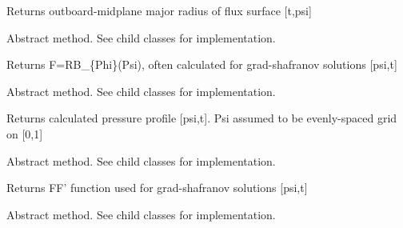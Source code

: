\documentclass[letterpaper,10pt,english]{sphinxmanual}
\begin{document}
\begin{fulllineitems}
\begin{fulllineitems}
Returns outboard-midplane major radius of flux surface {[}t,psi{]}

\end{fulllineitems}


\begin{fulllineitems}
\label{\detokenize{eqtools:eqtools.core.Equilibrium.getF}}
Abstract method.  See child classes for implementation.

Returns F=RB\_\{Phi\}(Psi), often calculated for grad-shafranov solutions  {[}psi,t{]}

\end{fulllineitems}


\begin{fulllineitems}
\label{\detokenize{eqtools:eqtools.core.Equilibrium.getFluxPres}}
Abstract method.  See child classes for implementation.

Returns calculated pressure profile {[}psi,t{]}.
Psi assumed to be evenly-spaced grid on {[}0,1{]}

\end{fulllineitems}


\begin{fulllineitems}
\label{\detokenize{eqtools:eqtools.core.Equilibrium.getFFPrime}}
Abstract method.  See child classes for implementation.

Returns FF’ function used for grad-shafranov solutions {[}psi,t{]}

\end{fulllineitems}


\begin{fulllineitems}
\label{\detokenize{eqtools:eqtools.core.Equilibrium.getPPrime}}
Abstract method.  See child classes for implementation.


\end{fulllineitems}
\end{fulllineitems}
\end{document}
